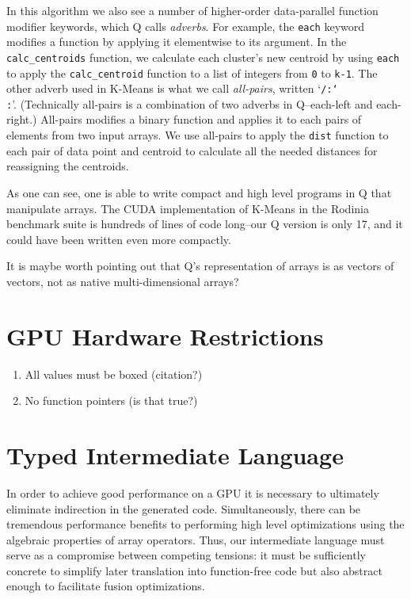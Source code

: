 \documentclass[preprint]{sigplanconf}
\begin{document}
In this algorithm we also see a number of higher-order data-parallel function
modifier keywords, which Q calls \emph{adverbs}.  For example, the \texttt{each}
keyword modifies a function by applying it elementwise to its argument.  In the
\texttt{calc\_centroids} function, we calculate each cluster's new centroid
by using \texttt{each} to apply the \texttt{calc\_centroid} function to a
list of integers from \texttt{0} to \texttt{k-1}.  The other adverb used in
K-Means is what we call \emph{all-pairs}, written `\texttt{/:\char`\\:}'.
(Technically all-pairs is a combination of two adverbs in Q--each-left and
each-right.) All-pairs modifies a binary function and applies it to each
pairs of elements from two input arrays.  We use all-pairs to apply the
\texttt{dist} function to each pair of data point and centroid to calculate all
the needed distances for reassigning the centroids.

As one can see, one is able to write compact and high level programs in Q
that manipulate arrays.  The CUDA implementation of K-Means in the Rodinia
benchmark suite is hundreds of lines of code long--our Q version is only 17,
and it could have been written even more compactly.

It is maybe worth pointing out that Q's representation of arrays is as vectors
of vectors, not as native multi-dimensional arrays?

\section{GPU Hardware Restrictions}
\begin{enumerate}
\item All values must be boxed (citation?)
\item No function pointers (is that true?)
\end{enumerate}

\section{Typed Intermediate Language}
In order to achieve good performance on a GPU it is necessary to ultimately eliminate indirection in the generated code. Simultaneously, there can be tremendous performance benefits to performing high level optimizations using the algebraic properties of array operators. Thus, our intermediate language must serve as a compromise between competing tensions: it must be sufficiently concrete to simplify later translation into function-free code but also abstract enough to facilitate fusion optimizations.  \\
\end{document}
